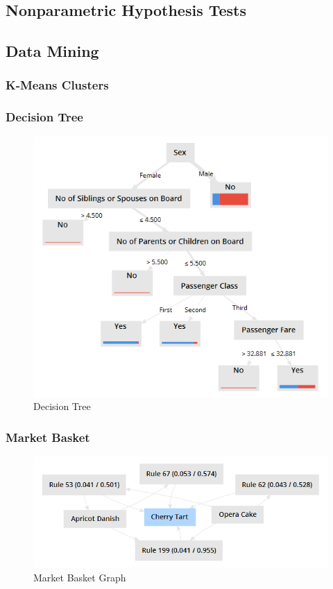\subsection{Nonparametric Hypothesis Tests}

\subsection{Data Mining}

\subsubsection{K-Means Clusters}

\subsubsection{Decision Tree}

\begin{figure}[H]
	\centering
	\includegraphics[width=\maxwidth{.95\linewidth}]{gfx/06-DecisionTree}
	\caption{Decision Tree}
	\label{fig06.05}
\end{figure}




\subsubsection{Market Basket}

\begin{figure}[H]
	\centering
	\includegraphics[width=\maxwidth{.95\linewidth}]{gfx/06-MarketBasketGraph}
	\caption{Market Basket Graph}
	\label{fig06.06}
\end{figure}


